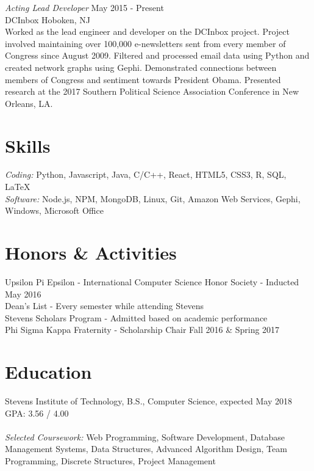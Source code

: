 \documentclass{res}
\begin{document}
{{\sl Acting Lead Developer} \hfill May 2015 - Present \\
DCInbox \hfill Hoboken, NJ \\
Worked as the lead engineer and developer on the DCInbox project. Project involved maintaining over 100,000 e-newsletters sent from every member of Congress since August 2009. Filtered and processed email data using Python and created network graphs using Gephi. Demonstrated connections between members of Congress and sentiment towards President Obama. Presented research at the 2017 Southern Political Science Association Conference in New Orleans, LA.


\section{\bf\large Skills}
{\sl Coding: } Python, Javascript, Java, C/C++, React, HTML5, CSS3, R, SQL, LaTeX \\
{\sl Software:} Node.js, NPM, MongoDB, Linux, Git, Amazon Web Services, Gephi, Windows, Microsoft Office

\section{\bf\large Honors \& Activities}
Upsilon Pi Epsilon - International Computer Science Honor Society - Inducted May 2016\\
Dean's List - Every semester while attending Stevens \\
Stevens Scholars Program - Admitted based on academic performance \\ %
Phi Sigma Kappa Fraternity - Scholarship Chair Fall 2016 \& Spring 2017

\section{\bf\large Education}
Stevens Institute of Technology, B.S., Computer Science, expected May 2018 \hfill GPA: 3.56 / 4.00 \\ \\
{\sl Selected Coursework:} Web Programming, Software Development, Database Management Systems, Data Structures, Advanced Algorithm Design, Team Programming, Discrete Structures, Project Management

}
\end{document}
